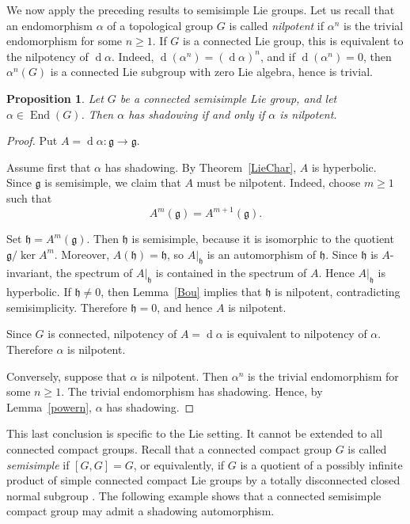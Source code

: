 \documentclass[12pt]{amsart}
\newtheorem{proposition}[theorem]{Proposition}
\theoremstyle{definition}
\numberwithin{equation}{section}
\theoremstyle{remark}
\DeclareMathOperator{\di}{d}
\begin{document}
We now apply the preceding results to semisimple Lie groups. Let us recall
that an endomorphism $\alpha$ of a topological group $G$ is called
\emph{nilpotent} if $\alpha^n$ is the trivial endomorphism for some
$n\geq 1$. If $G$ is a connected Lie group, this is equivalent to the
nilpotency of $\di\alpha$. Indeed,
$\di(\alpha^n)=(\di\alpha)^n$, and if $\di(\alpha^n)=0$, then
$\alpha^n(G)$ is a connected Lie subgroup with zero Lie algebra, hence is
trivial.



\begin{proposition}\label{semisim}
	Let $G$ be a connected semisimple Lie group, and let
	$\alpha\in\operatorname{End}(G)$. Then $\alpha$ has shadowing if and only if
	$\alpha$ is nilpotent.
\end{proposition}

\begin{proof}
	Put $A=\di\alpha:\mathfrak g\to\mathfrak g$.
	
	Assume first that $\alpha$ has shadowing. By Theorem~\ref{LieChar}, $A$ is
	hyperbolic. Since $\mathfrak g$ is semisimple, we claim that $A$ must be
	nilpotent. Indeed, choose $m\geq 1$ such that
	\[
	A^m(\mathfrak g)=A^{m+1}(\mathfrak g).
	\]

Set $\mathfrak h=A^m(\mathfrak g)$. Then $\mathfrak h$ is semisimple,
because it is isomorphic to the quotient $\mathfrak g/\ker A^m$. Moreover,
$A(\mathfrak h)=\mathfrak h$, so $A|_{\mathfrak h}$ is an automorphism of
$\mathfrak h$. Since $\mathfrak h$ is $A$-invariant, the spectrum of
$A|_{\mathfrak h}$ is contained in the spectrum of $A$. Hence
$A|_{\mathfrak h}$ is hyperbolic. If $\mathfrak h\neq 0$, then
Lemma~\ref{Bou} implies that $\mathfrak h$ is nilpotent, contradicting
semisimplicity. Therefore $\mathfrak h=0$, and hence $A$ is nilpotent.


	
	Since $G$ is connected, nilpotency of $A=\di\alpha$ is equivalent to
	nilpotency of $\alpha$. Therefore $\alpha$ is nilpotent.
	
	Conversely, suppose that $\alpha$ is nilpotent. Then $\alpha^n$ is the
	trivial endomorphism for some $n\geq 1$. The trivial endomorphism has
	shadowing. Hence, by Lemma~\ref{powern}, $\alpha$ has shadowing.
\end{proof}


This last conclusion is specific to the Lie setting. It cannot be extended to all connected compact groups. Recall that a connected compact group $G$ is called \emph{semisimple} if $[G,G]=G$, or equivalently, if $G$ is a quotient of a possibly infinite product of simple connected compact Lie groups by a totally disconnected closed normal subgroup \cite{HM}. The following example shows that a connected semisimple compact group may admit a shadowing automorphism.
\end{document}
